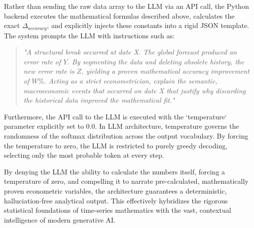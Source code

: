 \documentclass[11pt, a4paper]{report}
\begin{document}
Rather than sending the raw data array to the LLM via an API call, the Python backend executes the mathematical formulas described above, calculates the exact $\Delta_{accuracy}$, and explicitly injects these constants into a rigid JSON template. The system prompts the LLM with instructions such as: 

\begin{quote}
\textit{"A structural break occurred at date X. The global forecast produced an error rate of $Y$. By segmenting the data and deleting obsolete history, the new error rate is $Z$, yielding a proven mathematical accuracy improvement of $W\%$. Acting as a strict econometrician, explain the semantic, macroeconomic events that occurred on date X that justify why discarding the historical data improved the mathematical fit."}
\end{quote}

Furthermore, the API call to the LLM is executed with the `temperature` parameter explicitly set to $0.0$. In LLM architecture, temperature governs the randomness of the softmax distribution across the output vocabulary. By forcing the temperature to zero, the LLM is restricted to purely greedy decoding, selecting only the most probable token at every step. 

By denying the LLM the ability to calculate the numbers itself, forcing a temperature of zero, and compelling it to narrate pre-calculated, mathematically proven econometric variables, the architecture guarantees a deterministic, halluciation-free analytical output. This effectively hybridizes the rigorous statistical foundations of time-series mathematics with the vast, contextual intelligence of modern generative AI.
\end{document}
